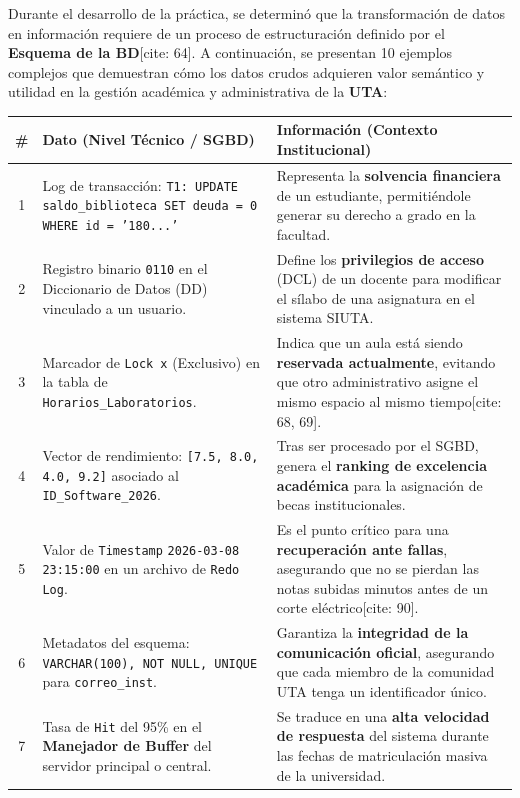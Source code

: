\documentclass{article}
\begin{document}
Durante el desarrollo de la práctica, se determinó que la transformación de datos en información requiere de un proceso de estructuración definido por el \textbf{Esquema de la BD}[cite: 64]. A continuación, se presentan 10 ejemplos complejos que demuestran cómo los datos crudos adquieren valor semántico y utilidad en la gestión académica y administrativa de la \textbf{UTA}:

\begin{table}[H]
\centering
\small
\begin{tabular}{|c|p{5cm}|p{8cm}|}
\hline
\rowcolor[HTML]{C0C0C0} 
\textbf{\#} & \textbf{Dato (Nivel Técnico / SGBD)} & \textbf{Información (Contexto Institucional)} \\ \hline
1  & Log de transacción: \texttt{T1: UPDATE saldo\_biblioteca SET deuda = 0 WHERE id = '180...'} & Representa la \textbf{solvencia financiera} de un estudiante, permitiéndole generar su derecho a grado en la facultad. \\ \hline
2  & Registro binario \texttt{0110} en el Diccionario de Datos (DD) vinculado a un usuario. & Define los \textbf{privilegios de acceso} (DCL) de un docente para modificar el sílabo de una asignatura en el sistema SIUTA. \\ \hline
3  & Marcador de \texttt{Lock x} (Exclusivo) en la tabla de \texttt{Horarios\_Laboratorios}. & Indica que un aula está siendo \textbf{reservada actualmente}, evitando que otro administrativo asigne el mismo espacio al mismo tiempo[cite: 68, 69]. \\ \hline
4  & Vector de rendimiento: \texttt{[7.5, 8.0, 4.0, 9.2]} asociado al \texttt{ID\_Software\_2026}. & Tras ser procesado por el SGBD, genera el \textbf{ranking de excelencia académica} para la asignación de becas institucionales. \\ \hline
5  & Valor de \texttt{Timestamp} \texttt{2026-03-08 23:15:00} en un archivo de \texttt{Redo Log}. & Es el punto crítico para una \textbf{recuperación ante fallas}, asegurando que no se pierdan las notas subidas minutos antes de un corte eléctrico[cite: 90]. \\ \hline
6  & Metadatos del esquema: \texttt{VARCHAR(100), NOT NULL, UNIQUE} para \texttt{correo\_inst}. & Garantiza la \textbf{integridad de la comunicación oficial}, asegurando que cada miembro de la comunidad UTA tenga un identificador único. \\ \hline
7  & Tasa de \texttt{Hit} del 95\% en el \textbf{Manejador de Buffer} del servidor principal o central. & Se traduce en una \textbf{alta velocidad de respuesta} del sistema durante las fechas de matriculación masiva de la universidad. \\ \hline

\end{tabular}
\end{table}
\end{document}

